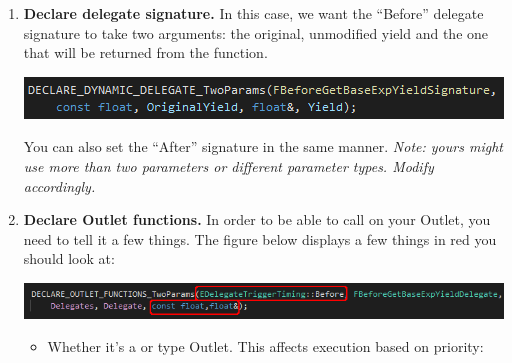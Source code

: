 \begin{enumerate}
	\item{\textbf{Declare delegate signature.} In this case, we want the ``Before'' delegate signature to take two arguments: the original, unmodified yield and the one that will be returned from the  function.\\
	\begin{center}
		\includegraphics[scale=\ScreenshotScale]{create-outlet-signature}
	\end{center}
	You can also set the ``After'' signature in the same manner. \textit{Note: yours might use more than two parameters or different parameter types. Modify accordingly.}
	}
	\item{\textbf{Declare Outlet functions.} In order to be able to call  on your Outlet, you need to tell it a few things. The figure below displays a few things in red you should look at:\\
	\begin{center}
		\includegraphics[scale=\ScreenshotScale]{create-outlet-functions}
	\end{center}
		\begin{itemize}
			\item{Whether it's a  or  type Outlet. This affects execution based on priority:
			\begin{tcolorbox}[colback=gray!20!white,colframe=blue!75!black,title=Priorities]
			

\end{tcolorbox}}
\end{itemize}}
\end{enumerate}
